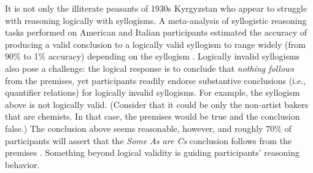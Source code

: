 \documentclass[floatsintext, doc]{apa6}
\begin{document}
It is not only the illiterate peasants of 1930s Kyrgyzstan who appear to struggle with reasoning logically with syllogisms.
A meta-analysis of syllogistic reasoning tasks performed on American and Italian participants estimated the accuracy of producing a valid conclusion to a logically valid syllogism to range widely (from 90\% to 1\% accuracy) depending on the syllogism \cite{Khemlani2012}.
Logically invalid syllogisms also pose a challenge: the logical response is to conclude that \emph{nothing follows} from the premises, yet participants readily endorse substantive conclusions (i.e., quantifier relations) for logically invalid syllogisms. 
For example, the syllogism above is not logically valid.  (Consider that it could be only the non-artist bakers that are chemists. In that case, the premises would be true and the conclusion false.)
The conclusion above seems reasonable, however, and roughly 70\% of participants will assert that the \emph{Some As are Cs} conclusion follows from the premises  \cite{Khemlani2012}.
Something beyond logical validity is guiding participants' reasoning behavior. 




%
%
%


\end{document}

